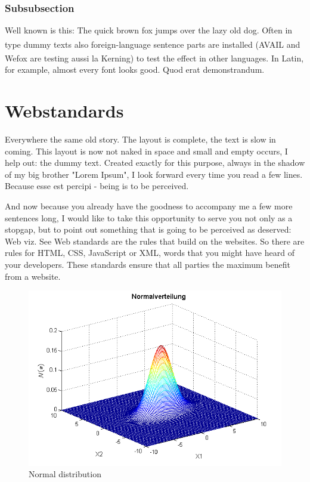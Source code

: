 \subsubsection{Subsubsection}

Well known is this: The quick brown fox jumps over the lazy old dog. Often in type dummy texts also foreign-language sentence parts are installed (AVAIL\textsuperscript{\texttrademark} and Wefox\textsuperscript{\textregistered} are testing aussi la Kerning) to test the effect in other languages. In Latin, for example, almost every font looks good. Quod erat demonstrandum.

\section{Webstandards}
\label{sec:satzspiegeltest_webstandards}

Everywhere the same old story. The layout is complete, the text is slow in coming. This layout is now not naked in space and small and empty occurs, I help out: the dummy text. Created exactly for this purpose, always in the shadow of my big brother "Lorem Ipsum", I look forward every time you read a few lines. Because esse est percipi - being is to be perceived.

And now because you already have the goodness to accompany me a few more sentences long, I would like to take this opportunity to serve you not only as a stopgap, but to point out something that is going to be perceived as deserved: Web viz. See Web standards are the rules that build on the websites. So there are rules for HTML, CSS, JavaScript or XML, words that you might have heard of your developers. These standards ensure that all parties the maximum benefit from a website.

\begin{figure}[H]
	\centering
		\includegraphics[scale=0.7]{images/multivariate_gauss.png}
	\caption{Normal distribution}
	\label{fig:normal_distribution}
\end{figure}

